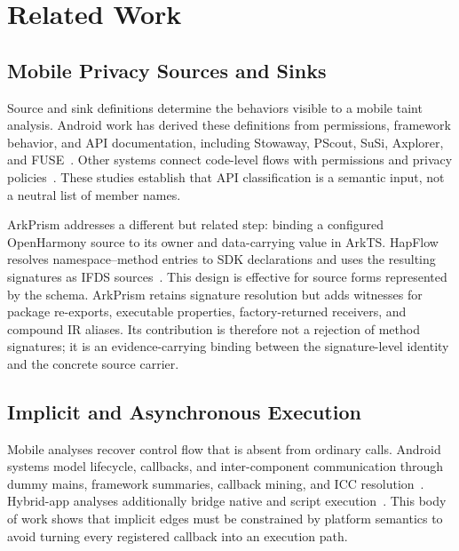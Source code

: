 \section{Related Work}
\label{sec:related}

\subsection{Mobile Privacy Sources and Sinks}

Source and sink definitions determine the behaviors visible to a mobile taint analysis. Android work has derived these definitions from permissions, framework behavior, and API documentation, including Stowaway, PScout, SuSi, Axplorer, and FUSE~\cite{stowaway,pscout,susi,axplorer,fuse}. Other systems connect code-level flows with permissions and privacy policies~\cite{appaudit,appintent,policheck,ppchecker}. These studies establish that API classification is a semantic input, not a neutral list of member names.

ArkPrism addresses a different but related step: binding a configured OpenHarmony source to its owner and data-carrying value in ArkTS. HapFlow resolves namespace--method entries to SDK declarations and uses the resulting signatures as IFDS sources~\cite{hapflow}. This design is effective for source forms represented by the schema. ArkPrism retains signature resolution but adds witnesses for package re-exports, executable properties, factory-returned receivers, and compound IR aliases. Its contribution is therefore not a rejection of method signatures; it is an evidence-carrying binding between the signature-level identity and the concrete source carrier.

\subsection{Implicit and Asynchronous Execution}

Mobile analyses recover control flow that is absent from ordinary calls. Android systems model lifecycle, callbacks, and inter-component communication through dummy mains, framework summaries, callback mining, and ICC resolution~\cite{comdroid,chex,epicc,ic3,iccta,didfail,raicc,edgeminer,arzt14}. Hybrid-app analyses additionally bridge native and script execution~\cite{lee16,bridgescope,babelview,eoeidroid}. This body of work shows that implicit edges must be constrained by platform semantics to avoid turning every registered callback into an execution path.

